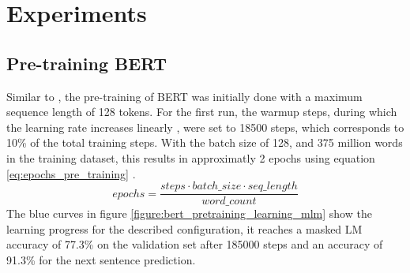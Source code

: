 \chapter{Experiments}\label{ch:experiments}

\section{Pre-training \ac{BERT}}
\label{sec:pre_training_results}
Similar to \cite[p. 13]{Devlin2018}, the pre-training of \ac{BERT} was initially done with a maximum sequence length of 128 tokens.
For the first run, the warmup steps, during which the learning rate increases linearly \cite[p. 13]{Devlin2018}, were set to 18500 steps, which corresponds to 10\% of the total training steps.
With the batch size of 128, and 375 million words in the training dataset, this results in approximatly 2 epochs using equation \ref{eq:epochs_pre_training} \cite[p. 13]{Devlin2018}.
\begin{equation}
    \label{eq:epochs_pre_training}
    epochs = \frac{steps \cdot batch\_size \cdot seq\_length}{word\_count}
\end{equation}
The blue curves in figure \ref{figure:bert_pretraining_learning_mlm} show the learning progress for the described configuration, it reaches a masked LM accuracy of 77.3\% on the validation set after 185000 steps and an accuracy of 91.3\% for the next sentence prediction.
